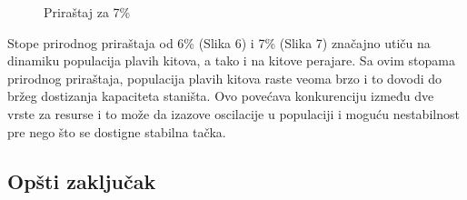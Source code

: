 \documentclass[a4paper]{article}
\begin{document}
{\begin{figure}[h]
\begin{minipage}[h]{0.45\linewidth}
			\caption{Priraštaj za 7\%} 
			\label{slika2: uticaj7}
		\end{minipage}
	\end{figure}

	
	Stope prirodnog priraštaja od 6\% (Slika 6) i 7\% (Slika 7) značajno utiču na dinamiku populacija plavih kitova, a tako i na kitove perajare. Sa ovim stopama prirodnog priraštaja, populacija plavih kitova raste veoma brzo i to dovodi do bržeg dostizanja kapaciteta staništa. Ovo povećava konkurenciju između dve vrste za resurse i to može da izazove oscilacije u populaciji i moguću nestabilnost pre nego što se dostigne stabilna tačka. 

	
	\subsection{Opšti zaključak}
	\label{sec: opsti-zakljucak}
	
}
\end{document}
